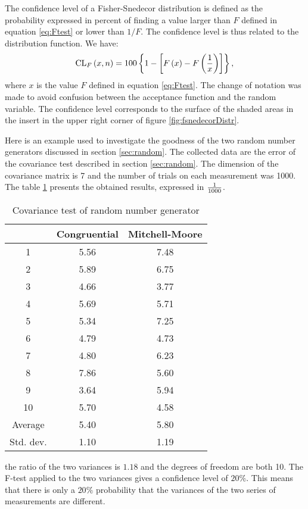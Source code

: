 \documentclass[twoside]{book}
\begin{document}
The confidence level of a Fisher-Snedecor distribution is defined
as the probability expressed in percent of finding a value larger
than $F$ defined in equation \ref{eq:Ftest} or lower than $1/F$.
The confidence level is thus related to the distribution function.
We have:
\begin{equation}
\label{eq:fcl}
  {\mathop{\rm CL}}_F\left(x,n\right)=100\left\{1-\left[F\left(x\right)-F\left({1\over x}\right)
  \right]\right\},
\end{equation}
where $x$ is the value $F$ defined in equation \ref{eq:Ftest}. The
change of notation was made to avoid confusion between the
acceptance function and the random variable.  The confidence level
corresponds to the surface of the shaded areas in the insert in
the upper right corner of figure \ref{fig:fsnedecorDistr}.

 Here is an example used to investigate the
goodness of the two random number generators discussed in section
\ref{sec:random}. The collected data are the error of the
covariance test described in section \ref{sec:random}. The
dimension of the covariance matrix is 7 and the number of trials
on each measurement was 1000. The table \ref{tb:Ftest} presents
the obtained results, expressed in ${1\over 1000}$.
\begin{table}[h]
\vspace{1 ex}
  \centering
  \caption{Covariance test of random number generator}\label{tb:Ftest}
\vspace{1 ex}
  \begin{tabular}{|c|c|c|} \hline
     & Congruential & Mitchell-Moore \\ \hline
    1 & 5.56 & 7.48 \\
    2 & 5.89 & 6.75 \\
    3 & 4.66 & 3.77 \\
    4 & 5.69 & 5.71 \\
    5 & 5.34 & 7.25 \\
    6 & 4.79 & 4.73 \\
    7 & 4.80 & 6.23 \\
    8 & 7.86 & 5.60 \\
    9 & 3.64 & 5.94 \\
    10 & 5.70 & 4.58 \\ \hline
    Average & 5.40 & 5.80 \\
    Std. dev. & 1.10 & 1.19 \\ \hline
  \end{tabular}
\end{table}
the ratio of the two variances is $1.18$ and the degrees of
freedom are both 10. The F-test applied to the two variances gives
a confidence level of $20\%$. This means that there is only a
$20\%$ probability that the variances of the two series of
measurements are different.
\end{document}
